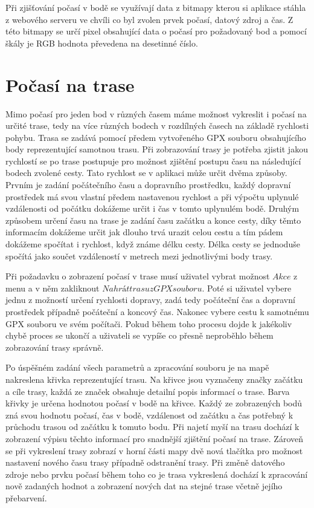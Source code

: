 \documentclass[czech,bachelor,dept460,male,csharp,cpdeclaration]{diploma}
\begin{document}
	Při zjišťování počasí v bodě se využívají data z bitmapy kterou si aplikace stáhla z webového serveru ve chvíli co byl zvolen prvek počasí, datový zdroj a čas. Z této bitmapy se určí pixel obsahující data o počasí pro požadovaný bod a pomocí škály je RGB hodnota převedena na desetinné číslo.
	
	\section{Počasí na trase}
	
	Mimo počasí pro jeden bod v různých časem máme možnost vykreslit i počasí na určité trase, tedy na více různých bodech v rozdílných časech na základě rychlosti pohybu. Trasa se zadává pomocí předem vytvořeného GPX souboru obsahujícího body reprezentující samotnou trasu. Při zobrazování trasy je potřeba zjistit jakou rychlostí se po trase postupuje pro možnost zjištění postupu času na následující bodech zvolené cesty. Tato rychlost se v aplikaci může určit dvěma způsoby. Prvním je zadání počátečního času a dopravního prostředku, každý dopravní prostředek má svou vlastní předem nastavenou rychlost a při výpočtu uplynulé vzdálenosti od počátku dokážeme určit i čas v tomto uplynulém bodě. Druhým způsobem určení času na trase je zadání času začátku a konce cesty, díky těmto informacím dokážeme určit jak dlouho trvá urazit celou cestu a tím pádem dokážeme spočítat i rychlost, když známe délku cesty. Délka cesty se jednoduše spočítá jako součet vzdáleností v metrech mezi jednotlivými body trasy.
	
	Při požadavku o zobrazení počasí v trase musí uživatel vybrat možnost $Akce$ z menu a v něm zakliknout $Nahrát trasu z GPX souboru$. Poté si uživatel vybere jednu z možností určení rychlosti dopravy, zadá tedy počáteční čas a dopravní prostředek případně počáteční a koncový čas. Nakonec vybere cestu k samotnému GPX souboru ve svém počítači. Pokud během toho procesu dojde k jakékoliv chybě proces se ukončí a uživateli se vypíše co přesně neproběhlo během zobrazování trasy správně.
	
	Po úspěšném zadání všech parametrů a zpracování souboru je na mapě nakreslena křivka reprezentující trasu. Na křivce jsou vyznačeny značky začátku a cíle trasy, každá ze značek obsahuje detailní popis informací o trase. Barva křivky je určena hodnotou počasí v bodě na křivce. Každý ze zobrazených bodů zná svou hodnotu počasí, čas v bodě, vzdálenost od začátku a čas potřebný k průchodu trasou od začátku k tomuto bodu. Při najetí myší na trasu dochází k zobrazení výpisu těchto informací pro snadnější zjištění počasí na trase. Zároveň se při vykreslení trasy zobrazí v horní části mapy dvě nová tlačítka pro možnost nastavení nového času trasy případně odstranění trasy. Při změně datového zdroje nebo prvku počasí během toho co je trasa vykreslená dochází k zpracování nově zadaných hodnot a zobrazení nových dat na stejné trase včetně jejího přebarvení.
	
\end{document}
